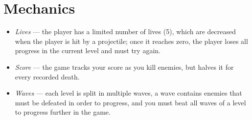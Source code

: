 \documentclass{article}
\begin{document}
    \section{Mechanics}
    \begin{itemize}
        \item \emph{Lives} --- the player has a limited number of lives (5), which are decreased when
        the player is hit by a projectile; once it reaches zero, the player loses all progress in the
        current level and must try again.
        \item \emph{Score} --- the game tracks your score as you kill enemies, but halves it for every
        recorded death.
        \item \emph{Waves} --- each level is split in multiple waves, a wave contains enemies that must
        be defeated in order to progress, and you must beat all waves of a level to progress further in
        the game.
    \end{itemize}
\end{document}

